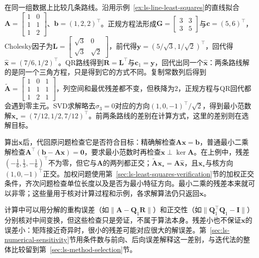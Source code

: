 在同一组数据上比较几条路线。沿用示例~\ref{ex:ls-line-least-squares}的直线拟合$\bm A=\left[\begin{smallmatrix}1&0\\1&1\\1&2\end{smallmatrix}\right]$、$\bm b=(1,2,2)^\top$。正规方程法形成$\bm G=\left[\begin{smallmatrix}3&3\\3&5\end{smallmatrix}\right]$与$\bm c=(5,6)^\top$，Cholesky因子为$\bm L=\left[\begin{smallmatrix}\sqrt3&0\\\sqrt3&\sqrt2\end{smallmatrix}\right]$，前代得$\bm y=(5/\sqrt3,1/\sqrt2)^\top$，回代得$\hat{\bm x}=(7/6,1/2)^\top$。QR路线得到$\bm R=\bm L^\top$与$\bm c_1=\bm y$，回代出同一个$\hat{\bm x}$：两条路线解的是同一个三角方程，只是得到它的方式不同。复制常数列后得到$\widetilde{\bm A}=\left[\begin{smallmatrix}1&0&1\\1&1&1\\1&2&1\end{smallmatrix}\right]$，列空间和最优残差都不变，但秩降为$2$，正规方程与QR回代都会遇到零主元。SVD求解略去$\sigma_3=0$对应的方向$(1,0,-1)^\top/\sqrt2$，得到最小范数解$\bm x_\star=(7/12,1/2,7/12)^\top$。前两条路线的差别在计算方式，这里的差别则在选解目标。

算出$\bm x$后，代回原问题检查它是否符合目标：精确解检查$\bm A\bm x=\bm b$，普通最小二乘解检查$\bm A^\top(\bm b-\bm A\bm x)=\bm0$，要求最小范数时再检查$\bm x\perp\ker\bm A$。在上例中，残差$(-\tfrac16,\tfrac13,-\tfrac16)^\top$不为零，但它与$\bm A$的两列都正交；$\widetilde{\bm A}\bm x_\star=\bm A\hat{\bm x}$，且$\bm x_\star$与核方向$(1,0,-1)^\top$正交。加权问题使用第~\ref{sec:ls-least-squares-verification}节的加权正交条件，齐次问题检查单位长度以及是否为最小特征方向。最小二乘的残差本来就可以非零；这些量用于核对计算过程和示例，各求解算法仍只返回$\bm x$。

计算中可以用分解的重构误差（如$\lVert\bm A-\bm Q_1\bm R\rVert$）和正交性（如$\lVert\bm Q_1^\top\bm Q_1-\bm I\rVert$）分别核对中间变换，但这些检查只是旁证，不属于算法本身。残差小也不保证$\bm x$的误差小：矩阵接近奇异时，很小的残差可能对应很大的解误差。第~\ref{sec:ls-numerical-sensitivity}节用条件数与前向、后向误差解释这一差别，与迭代法的整体比较留到第~\ref{sec:ls-method-selection}节。
